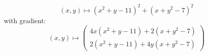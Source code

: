 \documentclass[17pt]{extarticle}
\begin{document}
$$
(x,y)\mapsto (x^2+y-11)^2+(x+y^2-7)^2
$$
with gradient:
$$
(x,y)\mapsto
\begin{pmatrix}
	4x(x^2+y-11)+2(x+y^2-7)\\
	2(x^2+y-11)+4y(x+y^2-7)
\end{pmatrix}
$$
\end{document}
